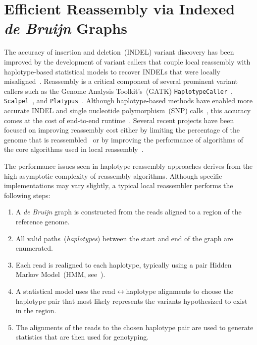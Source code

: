 \documentclass[masters]{ucbthesis}
\begin{document}
\section{Efficient Reassembly via Indexed \emph{de Bruijn} Graphs}
\label{sec:reference-threaded}

The accuracy of insertion and deletion~(INDEL) variant discovery has been improved by the development
of variant callers that couple local reassembly with haplotype-based statistical models to recover INDELs
that were locally misaligned~\cite{albers11}. Reassembly is a critical component of several prominent variant
callers such as the Genome
Analysis Toolkit's~(GATK) \texttt{HaplotypeCaller}~\cite{depristo11}, \texttt{Scalpel}~\cite{narzisi14}, and
\texttt{Platypus}~\cite{rimmer14}. Although haplotype-based methods have enabled more accurate INDEL
and single nucleotide polymorphism~(SNP) calls~\cite{bao14}, this accuracy comes at the cost of
end-to-end runtime~\cite{talwalkar14}. Several recent projects have been focused on improving
reassembly cost either by limiting the percentage of the genome that is reassembled~\cite{bloniarz14} or
by improving the performance of algorithms of the core algorithms used in local
reassembly~\cite{rimmer14}.

The performance issues seen in haplotype reassembly approaches derives from the high asymptotic
complexity of reassembly algorithms. Although specific implementations may vary slightly, a typical
local reassembler performs the following steps:

\begin{enumerate}
\item A \emph{de Bruijn} graph is constructed from the reads aligned to a region of the reference genome.
\item All valid paths~(\emph{haplotypes}) between the start and end of the graph are enumerated.
\item Each read is realigned to each haplotype, typically using a pair Hidden Markov Model~(HMM,
see~\cite{durbin98}).
\item A statistical model uses the read$\leftrightarrow$haplotype alignments to choose the haplotype pair
that most likely represents the variants hypothesized to exist in the region.
\item The alignments of the reads to the chosen haplotype pair are used to generate statistics that are
then used for genotyping.
\end{enumerate}
\end{document}
